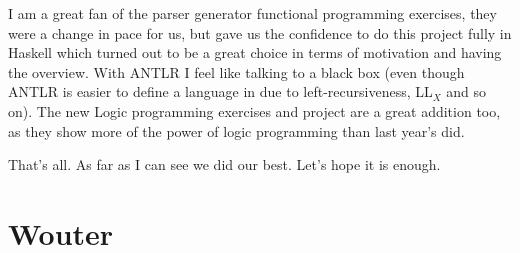 \documentclass[twoside]{report}
\begin{document}
I am a great fan of the parser generator functional programming exercises, they were a change in pace for us, but gave us the confidence to do this project fully in Haskell which turned out to be a great choice in terms of motivation and having the overview. With ANTLR I feel like talking to a black box (even though ANTLR is easier to define a language in due to left-recursiveness, LL$_X$ and so on). The new Logic programming exercises and project are a great addition too, as they show more of the power of logic programming than last year's did.

That's all. As far as I can see we did our best. Let's hope it is enough.

\section{Wouter}
\end{document}
